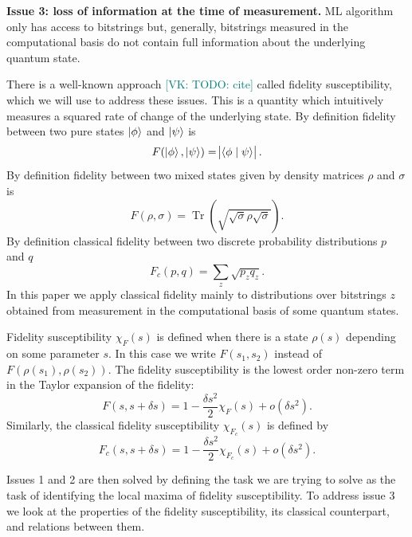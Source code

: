 \documentclass[american,aps,pra,reprint,floatfix,nofootinbib,superscriptaddress]{revtex4-2}
\DeclareMathOperator{\Tr}{Tr}
\newcommand{\VK}[1]{\textcolor{teal}{[VK: #1]}}
\begin{document}
\textbf{Issue 3: loss of information at the time of measurement.}
ML algorithm only has access to bitstrings but, generally, bitstrings measured
in the computational basis do not contain
full information about the underlying quantum state.

There is a well-known approach \VK{TODO: cite} called fidelity susceptibility,
which we will use to address these issues. This is a quantity which
intuitively measures a squared rate of change of the underlying state.
By definition fidelity between two pure states $\ket{\phi}$ and $\ket{\psi}$ is
\begin{equation}
\label{eq:def.F.pure}
  F(\ket{\phi}, \ket{\psi}) = \abs{
    \braket{\phi\mid \psi}}.
\end{equation}
By definition fidelity between two mixed states
given by density matrices $\rho$ and $\sigma$ is
\begin{equation}
\label{eq:def.F.mixed}
  F(\rho, \sigma) = \Tr\left(\sqrt{\sqrt{\sigma}\rho\sqrt{\sigma}}\right).
\end{equation}
By definition classical fidelity between two discrete probability distributions
$p$ and $q$
\begin{equation}
\label{eq:def.Fc}
  F_c(p, q) = \sum_z \sqrt{p_z q_z}.
\end{equation}
In this paper we apply classical fidelity mainly to distributions over bitstrings
$z$ obtained from measurement in the computational basis of some quantum states.

Fidelity susceptibility $\chi_F(s)$ is defined when there is a state $\rho(s)$
depending on some parameter $s$. In this case we write $F(s_1, s_2)$ instead
of $F(\rho(s_1), \rho(s_2))$. The fidelity susceptibility is the lowest order non-zero
term in the Taylor expansion of the fidelity:
\begin{equation}
\label{eq:def.chiF}
  F(s, s + \delta s) = 1 - \frac{\delta s^2}{2} \chi_F(s) + o(\delta s^2).
\end{equation}
Similarly, the classical fidelity susceptibility $\chi_{F_c}(s)$ is defined by
\begin{equation}
\label{eq:def.chiFc}
  F_c(s, s + \delta s) = 1 - \frac{\delta s^2}{2} \chi_{F_c}(s) + o(\delta s^2).
\end{equation}

Issues 1 and 2 are then solved by defining the task we are trying to solve
as the task of identifying the local maxima of fidelity susceptibility.
To address issue 3 we look at the properties of the fidelity
susceptibility, its classical counterpart, and relations between them.
\end{document}
